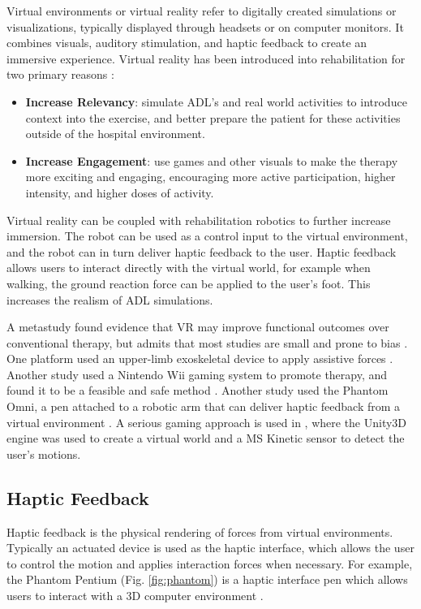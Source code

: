 \documentclass[12pt]{report}
\begin{document}
	Virtual environments or virtual reality refer to digitally created simulations or visualizations, typically displayed through headsets or on computer monitors. It combines visuals, auditory stimulation, and haptic feedback to create an immersive experience. Virtual reality has been introduced into rehabilitation for two primary reasons \cite{Laver2015}:
	\begin{itemize}
		\item \textbf{Increase Relevancy}: simulate ADL's and real world activities to introduce context into the exercise, and better prepare the patient for these activities outside of the hospital environment. 
		\item \textbf{Increase Engagement}: use games and other visuals to make the therapy more exciting and engaging, encouraging more active participation, higher intensity, and higher doses of activity. 
	\end{itemize}

	Virtual reality can be coupled with rehabilitation robotics to further increase immersion. The robot can be used as a control input to the virtual environment, and the robot can in turn deliver haptic feedback to the user. Haptic feedback allows users to interact directly with the virtual world, for example when walking, the ground reaction force can be applied to the user's foot. This increases the realism of ADL simulations. 
	
	A metastudy found evidence that VR may improve functional outcomes over conventional therapy, but admits that most studies are small and prone to bias \cite{Laver2015}. One platform used an upper-limb exoskeletal device to apply assistive forces  \cite{Patel2015}. Another study used a Nintendo Wii gaming system to promote therapy, and found it to be a feasible and safe method  \cite{Saposnik2010}. Another study used the Phantom Omni, a pen attached to a robotic arm that can deliver haptic feedback from a virtual environment \cite{Jiang2017}. A serious gaming approach is used in \cite{SociedadeBrasileiradeInformaticaemSaude2014}, where the Unity3D engine was used to create a virtual world and a MS Kinetic sensor to detect the user's motions. 
	
	\subsection{Haptic Feedback}
	
	Haptic feedback is the physical rendering of forces from virtual environments. Typically an actuated device is used as the haptic interface, which allows the user to control the motion and applies interaction forces when necessary. For example, the Phantom Pentium (Fig. \ref{fig:phantom}) is a haptic interface pen which allows users to interact with a 3D computer environment \cite{Massie1994}.
	
\end{document}
